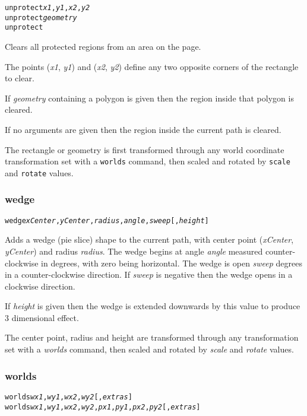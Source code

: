 \begin{alltt}
unprotect \textit{x1}, \textit{y1}, \textit{x2}, \textit{y2}
unprotect \textit{geometry}
unprotect
\end{alltt}

Clears all protected regions from an area on the page.

The points
(\textit{x1}, \textit{y1}) and (\textit{x2}, \textit{y2}) define
any two opposite corners of the rectangle to clear.

If \textit{geometry} containing a polygon is given then the region
inside that polygon is cleared.

If no arguments are given then the region inside the current path is cleared.

The rectangle or geometry
is first transformed through any world coordinate
transformation set with a \texttt{worlds} command,
then scaled and rotated by \texttt{scale}
and \texttt{rotate} values.

\subsubsection{wedge}

\begin{alltt}
wedge \textit{xCenter}, \textit{yCenter}, \textit{radius}, \textit{angle}, \textit{sweep} [, \textit{height} ]
\end{alltt}

Adds a wedge (pie slice) shape to the current path, with center
point (\textit{xCenter}, \textit{yCenter}) and radius
\textit{radius}.
The wedge begins at angle \textit{angle} measured
counter-clockwise in degrees, with zero being horizontal.
The wedge is open \textit{sweep} degrees in a counter-clockwise direction.
If \textit{sweep} is negative then the wedge opens in a clockwise direction.

If \textit{height} is given then the wedge is extended downwards
by this value to produce 3 dimensional effect.

The center point, radius and height are transformed through any
transformation set with a \textit{worlds} command,
then scaled and rotated by \textit{scale}
and \textit{rotate} values.

\subsubsection{worlds}

\begin{alltt}
worlds \textit{wx1}, \textit{wy1}, \textit{wx2}, \textit{wy2} [, \textit{extras} ]
worlds \textit{wx1}, \textit{wy1}, \textit{wx2}, \textit{wy2}, \textit{px1}, \textit{py1}, \textit{px2}, \textit{py2} [, \textit{extras} ]
\end{alltt}

